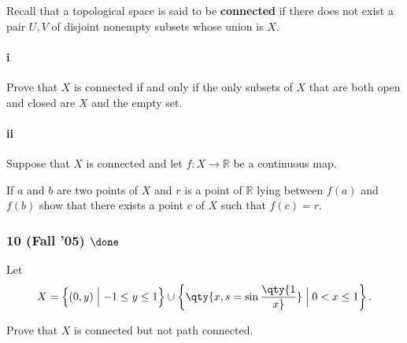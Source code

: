 Recall that a topological space is said to be \textbf{connected} if
there does not exist a pair \(U, V\) of disjoint nonempty subsets whose
union is \(X\).

\hypertarget{i}{%
\paragraph{i}\label{i}}

Prove that \(X\) is connected if and only if the only subsets of \(X\)
that are both open and closed are \(X\) and the empty set.

\hypertarget{ii}{%
\paragraph{ii}\label{ii}}

Suppose that \(X\) is connected and let \(f : X \to {\mathbb{R}}\) be a
continuous map.

If \(a\) and \(b\) are two points of \(X\) and \(r\) is a point of
\({\mathbb{R}}\) lying between \(f (a)\) and \(f (b)\) show that there
exists a point \(c\) of \(X\) such that \(f (c) = r\).

\hypertarget{fall-05-done-1}{%
\subsubsection{\texorpdfstring{10 (Fall '05)
\(\done\)}{10 (Fall '05) \textbackslash done}}\label{fall-05-done-1}}

Let
\begin{align*}
X = \left\{{(0, y) \mathrel{\Big|}- 1 \leq y \leq 1}\right\} \cup \left\{{\qty{x, s = \sin\qty{1 \over x}} \mathrel{\Big|}0 < x \leq 1}\right\}
.\end{align*}

Prove that \(X\) is connected but not path connected.

